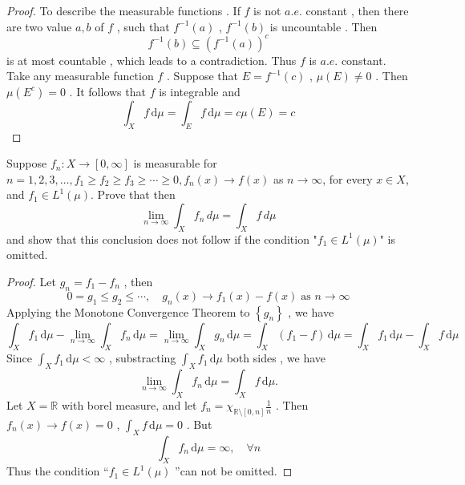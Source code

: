 \documentclass[../main.tex]{subfiles}
\begin{document}
\begin{proof}
     To describe the measurable functions .  If \(  f  \) is not \(  a.e.  \) constant , then  there are two value \(  a,b  \) of \(  f  \) , such that  \(  f^{-1} \left( a \right)   \) , \(  f^{-1} \left( b \right)   \) is uncountable . Then \[
     f^{-1} \left( b \right)\subseteq \left( f^{-1} \left( a \right)  \right)^{c}  
     \] is at most countable , which leads to a contradiction. Thus \(  f  \) is \(  a.e.  \) constant.  
    Take any measurable function \(  f  \) . Suppose that \(  E= f^{-1} \left( c \right)   \) , \(  \mu \left( E \right)\neq 0   \) .  Then \(  \mu \left( E^{c} \right)= 0   \) .    It follows that \(  f  \) is integrable and \[
    \int_{X}f\,\mathrm{d} \mu =  \int_{E}f\,\mathrm{d} \mu = c\mu \left( E \right)= c 
    \] 
\end{proof}

\begin{problem}{}{}
Suppose $f_n: X \to [0, \infty]$ is measurable for $n=1, 2, 3, \dots, f_1 \ge f_2 \ge f_3 \ge \cdots \ge 0, f_n(x) \to f(x)$ as $n \to \infty$, for every $x \in X$, and $f_1 \in L^1(\mu)$. Prove that then
\[ \lim_{n \to \infty} \int_X f_n \,d\mu = \int_X f \,d\mu \]
and show that this conclusion does not follow if the condition "$f_1 \in L^1(\mu)$" is omitted.
\end{problem}

\begin{proof}
    Let \(  g_{n}= f_1-f_{n}  \)  , then \[
    0= g_1\le g_2\le \cdots ,\quad  g_{n}\left( x \right)\to f_1\left( x \right)-f\left( x  \right)\; \text{as } n\to \infty   
    \] Applying the Monotone Convergence Theorem to \(  \left\{ g_{n} \right\}  \) , we have \[
 \int_{X}f_1\,\mathrm{d} \mu - \lim_{n\to \infty} \int_{X}f_{n}\,\mathrm{d} \mu =   \lim_{n\to \infty} \int_{X} g_{n}\,\mathrm{d} \mu = \int_{X} \left( f_1-f \right)\,\mathrm{d} \mu  =  \int_{X}f_1\,\mathrm{d} \mu - \int_{X} f\,\mathrm{d} \mu 
    \] Since \(  \int_{X}f_1\,\mathrm{d} \mu < \infty  \) ,  substracting \(  \int_{X}f_1\,\mathrm{d} \mu   \) both sides , we have \[
    \lim_{n\to \infty} \int_{X}f_{n}\,\mathrm{d} \mu = \int_{X}f\,\mathrm{d} \mu . 
    \] 
    Let \(  X= \mathbb{R}   \)  with borel measure, and let  \(  f_{n}= \chi _{\mathbb{R} \setminus [0,n]}  \frac{1 }{n } \) . Then \(  f_{n}\left( x \right)\to f\left( x \right)= 0    \) , \(  \int_{X}f\,\mathrm{d} \mu   = 0\) . But \[
    \int_{X}f_{n}\,\mathrm{d} \mu = \infty,\quad \forall n
    \]Thus the condition “\(  f_1\in L^{1}\left( \mu  \right)   \) ”can not be omitted.  
\end{proof}
\end{document}
